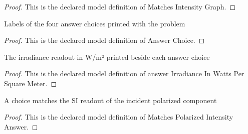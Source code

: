 \begin{proof}
  This is the declared model definition of Matches Intensity Graph.
\end{proof}
\begin{definition}
  \label{def:physics:phyx-mini-0105:phyxminiproblems-problemphyxmini0105-answerchoice}
  Labels of the four answer choices printed with the problem
\end{definition}
\begin{proof}
  This is the declared model definition of Answer Choice.
\end{proof}
\begin{definition}
  \label{def:physics:phyx-mini-0105:phyxminiproblems-problemphyxmini0105-answerirradianceinwattspersquaremeter}
  The irradiance readout in W/m² printed beside each answer choice
\end{definition}
\begin{proof}
  This is the declared model definition of answer Irradiance In Watts Per Square Meter.
\end{proof}
\begin{definition}
  \label{def:physics:phyx-mini-0105:phyxminiproblems-problemphyxmini0105-matchespolarizedintensityanswer}
  A choice matches the SI readout of the incident polarized component
\end{definition}
\begin{proof}
  This is the declared model definition of Matches Polarized Intensity Answer.
\end{proof}
